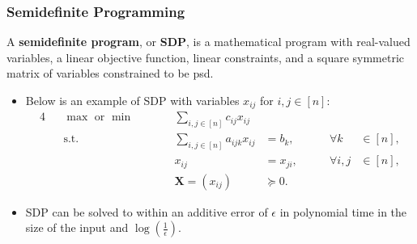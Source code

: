 \documentclass{beamer}
\begin{document}
    \begin{frame}
        \frametitle{Semidefinite Programming}
    
        \begin{definition}
            A {\bf semidefinite program}, or {\bf SDP}, is a mathematical program with real-valued variables, a linear objective function, linear constraints, and a square symmetric matrix of variables constrained to be psd.
        \end{definition}

        \pause

        \begin{itemize}
            \item Below is an example of SDP with variables $x_{ij}$ for $i, j \in [n]$:
            \begin{alignat}{4}
                && \max \text{ or } \min \qquad && \sum_{i, j \in [n]} c_{ij} x_{ij} \label{example:sdp} \\
                && \text{s.t.} \qquad && \sum_{i, j \in [n]} a_{ijk} x_{ij} &= b_k, & \qquad \forall k & \in [n], \nonumber \\
                && && x_{ij} &= x_{ji}, & \qquad \forall i, j & \in [n], \nonumber \\
                && && \mathbf X = \left(x_{ij}\right) & \succeq 0. \nonumber
              \end{alignat}
              \pause
              \vspace{-2em}
              \item SDP can be solved to within an additive error of $\epsilon$ in polynomial time in the size of the input and $\log(\frac{1}{\epsilon})$.
        \end{itemize}
    \end{frame}
\end{document}
